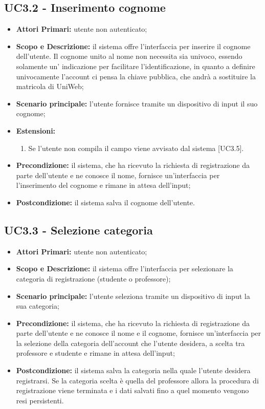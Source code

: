 \documentclass[AnalisiDeiRequisiti.tex]{subfiles}
\begin{document}
\subsection{UC3.2 - Inserimento cognome}
\begin{itemize}
	\item \textbf{Attori Primari:} utente non autenticato;
	\item \textbf{Scopo e Descrizione:} il sistema offre l'interfaccia per inserire il cognome dell'utente. Il cognome unito al nome non necessita sia univoco, essendo solamente un' indicazione per facilitare l'identificazione, in quanto a definire univocamente l'account ci pensa la chiave pubblica, che andrà a sostituire la matricola di UniWeb;
	\item \textbf{Scenario principale:} l'utente fornisce tramite un dispositivo di input il suo cognome;
	\item \textbf{Estensioni:}
		\begin{enumerate}
				\item Se l'utente non compila il campo viene avvisato dal sistema [UC3.5].
		\end{enumerate}		
	\item \textbf{Precondizione:} il sistema, che ha ricevuto la richiesta di registrazione da parte dell'utente e ne conosce il nome, fornisce un'interfaccia per l'inserimento del cognome e rimane in attesa dell'input;
	\item \textbf{Postcondizione:} il sistema salva il cognome dell'utente.
\end{itemize}
\subsection{UC3.3 - Selezione categoria}
\begin{itemize}
	\item \textbf{Attori Primari:} utente non autenticato;
	\item \textbf{Scopo e Descrizione:} il sistema offre l'interfaccia per selezionare la categoria di registrazione (studente o professore);
	\item \textbf{Scenario principale:} l'utente seleziona tramite un dispositivo di input la sua categoria;
	\item \textbf{Precondizione:} il sistema, che ha ricevuto la richiesta di registrazione da parte dell'utente e ne conosce il nome e il cognome, fornisce un'interfaccia per la selezione della categoria dell'account che l'utente desidera, a scelta tra professore e studente e rimane in attesa dell'input;
	\item \textbf{Postcondizione:} il sistema salva la categoria nella quale l'utente desidera registrarsi. Se la categoria scelta è quella del professore allora la procedura di registrazione viene terminata e i dati salvati fino a quel momento vengono resi persistenti.
\end{itemize}
\end{document}
